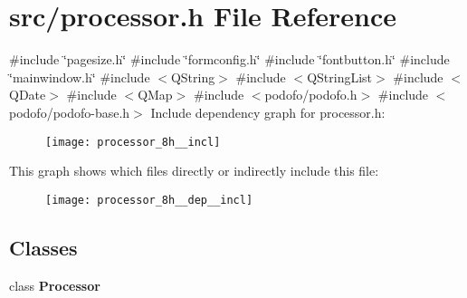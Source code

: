 \section{src/processor.h File Reference}
\label{processor_8h}
{\ttfamily \#include \char`\"{}pagesize.\+h\char`\"{}}\newline
{\ttfamily \#include \char`\"{}formconfig.\+h\char`\"{}}\newline
{\ttfamily \#include \char`\"{}fontbutton.\+h\char`\"{}}\newline
{\ttfamily \#include \char`\"{}mainwindow.\+h\char`\"{}}\newline
{\ttfamily \#include $<$Q\+String$>$}\newline
{\ttfamily \#include $<$Q\+String\+List$>$}\newline
{\ttfamily \#include $<$Q\+Date$>$}\newline
{\ttfamily \#include $<$Q\+Map$>$}\newline
{\ttfamily \#include $<$podofo/podofo.\+h$>$}\newline
{\ttfamily \#include $<$podofo/podofo-\/base.\+h$>$}\newline
Include dependency graph for processor.\+h\+:\nopagebreak
\begin{figure}[H]
\begin{center}
\leavevmode
\texttt{[image: processor\_8h\_\_incl]}
\end{center}
\end{figure}
This graph shows which files directly or indirectly include this file\+:\nopagebreak
\begin{figure}[H]
\begin{center}
\leavevmode
\texttt{[image: processor\_8h\_\_dep\_\_incl]}
\end{center}
\end{figure}
\subsection*{Classes}
\begin{DoxyCompactItemize}
\item 
class \textbf{ Processor}
\end{DoxyCompactItemize}
